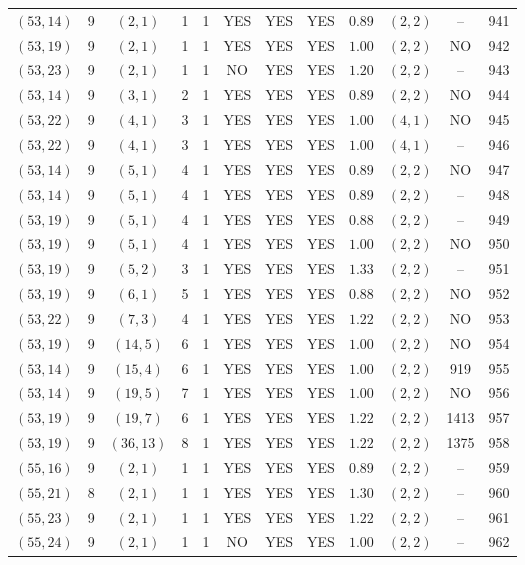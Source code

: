 \begin{longtable}{|c|c|c|c|c|c|c|c|c|c|c|c|}
$(53,14)$ & 9 & $(2,1)$ & 1 & 1 & YES & YES & YES & $0.89$ & $(2,2)$ & -- & 941\\
$(53,19)$ & 9 & $(2,1)$ & 1 & 1 & YES & YES & YES & $1.00$ & $(2,2)$ & NO & 942\\
$(53,23)$ & 9 & $(2,1)$ & 1 & 1 & NO & YES & YES & $1.20$ & $(2,2)$ & -- & 943\\
$(53,14)$ & 9 & $(3,1)$ & 2 & 1 & YES & YES & YES & $0.89$ & $(2,2)$ & NO & 944\\
$(53,22)$ & 9 & $(4,1)$ & 3 & 1 & YES & YES & YES & $1.00$ & $(4,1)$ & NO & 945\\
$(53,22)$ & 9 & $(4,1)$ & 3 & 1 & YES & YES & YES & $1.00$ & $(4,1)$ & -- & 946\\
$(53,14)$ & 9 & $(5,1)$ & 4 & 1 & YES & YES & YES & $0.89$ & $(2,2)$ & NO & 947\\
$(53,14)$ & 9 & $(5,1)$ & 4 & 1 & YES & YES & YES & $0.89$ & $(2,2)$ & -- & 948\\
$(53,19)$ & 9 & $(5,1)$ & 4 & 1 & YES & YES & YES & $0.88$ & $(2,2)$ & -- & 949\\
$(53,19)$ & 9 & $(5,1)$ & 4 & 1 & YES & YES & YES & $1.00$ & $(2,2)$ & NO & 950\\
$(53,19)$ & 9 & $(5,2)$ & 3 & 1 & YES & YES & YES & $1.33$ & $(2,2)$ & -- & 951\\
$(53,19)$ & 9 & $(6,1)$ & 5 & 1 & YES & YES & YES & $0.88$ & $(2,2)$ & NO & 952\\
$(53,22)$ & 9 & $(7,3)$ & 4 & 1 & YES & YES & YES & $1.22$ & $(2,2)$ & NO & 953\\
$(53,19)$ & 9 & $(14,5)$ & 6 & 1 & YES & YES & YES & $1.00$ & $(2,2)$ & NO & 954\\
$(53,14)$ & 9 & $(15,4)$ & 6 & 1 & YES & YES & YES & $1.00$ & $(2,2)$ & 919 & 955\\
$(53,14)$ & 9 & $(19,5)$ & 7 & 1 & YES & YES & YES & $1.00$ & $(2,2)$ & NO & 956\\
$(53,19)$ & 9 & $(19,7)$ & 6 & 1 & YES & YES & YES & $1.22$ & $(2,2)$ & 1413 & 957\\
$(53,19)$ & 9 & $(36,13)$ & 8 & 1 & YES & YES & YES & $1.22$ & $(2,2)$ & 1375 & 958\\
$(55,16)$ & 9 & $(2,1)$ & 1 & 1 & YES & YES & YES & $0.89$ & $(2,2)$ & -- & 959\\
$(55,21)$ & 8 & $(2,1)$ & 1 & 1 & YES & YES & YES & $1.30$ & $(2,2)$ & -- & 960\\
$(55,23)$ & 9 & $(2,1)$ & 1 & 1 & YES & YES & YES & $1.22$ & $(2,2)$ & -- & 961\\
$(55,24)$ & 9 & $(2,1)$ & 1 & 1 & NO & YES & YES & $1.00$ & $(2,2)$ & -- & 962\\

\end{longtable}
